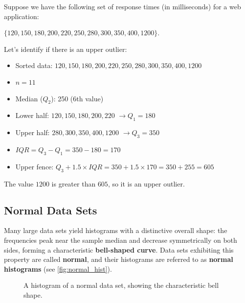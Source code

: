 \begin{example}

Suppose we have the following set of response times (in milliseconds) for a web application:

$\{120, 150, 180, 200, 220, 250, 280, 300, 350, 400, 1200\}$.

Let's identify if there is an upper outlier:

\begin{itemize}
    \item Sorted data: $120, 150, 180, 200, 220, 250, 280, 300, 350, 400, 1200$
    \item $n = 11$
    \item Median ($Q_2$): 250 (6th value)
    \item Lower half: $120, 150, 180, 200, 220$ $\rightarrow Q_1 = 180$
    \item Upper half: $280, 300, 350, 400, 1200$ $\rightarrow Q_3 = 350$
    \item $IQR = Q_3 - Q_1 = 350 - 180 = 170$
    \item Upper fence: $Q_3 + 1.5 \times IQR = 350 + 1.5 \times 170 = 350 + 255 = 605$
\end{itemize}

The value $1200$ is greater than $605$, so it is an upper outlier.

\end{example}

\subsection*{Normal Data Sets}

Many large data sets yield histograms with a distinctive overall shape: the frequencies peak near the sample median and decrease symmetrically on both sides, forming a characteristic \textbf{bell-shaped curve}. Data sets exhibiting this property are called \textbf{normal}, and their histograms are referred to as \textbf{normal histograms} (see \autoref{fig:normal_hist}).

\begin{figure}[h!]
    \centering
    \caption{A histogram of a normal data set, showing the characteristic bell shape.}
    \label{fig:normal_hist}
\end{figure}


